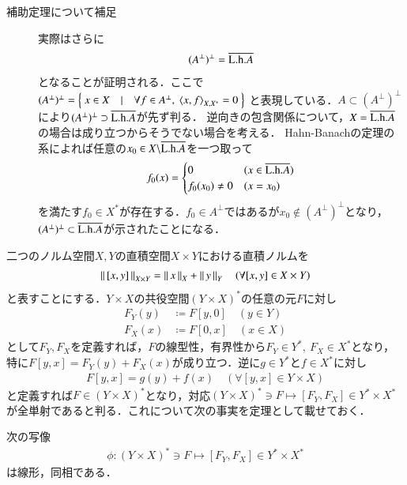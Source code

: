 	\begin{description}
		\item[補助定理について補足]
			実際はさらに
			\begin{align}
				(A^{\perp})^{\perp} = \overline{\mathrm{L.h.} A}
			\end{align}
			となることが証明される．ここで$(A^{\perp})^{\perp} = \left\{\ x \in X\quad |\quad \forall f \in A^{\perp},\ \inprod<x,f>_{X,X^*} = 0\ \right\}$
			と表現している．$A \subset (A^{\perp})^{\perp}$により$(A^{\perp})^{\perp} \supset \overline{\mathrm{L.h.} A}$が先ず判る．
			逆向きの包含関係について，$X = \overline{\mathrm{L.h.} A}$の場合は成り立つからそうでない場合を考える．
			Hahn-Banachの定理の系によれば任意の$x_0 \in X \backslash \overline{\mathrm{L.h.} A}$を一つ取って
			\begin{align}
				f_0(x) = 
				\begin{cases}
					0 & (x \in \overline{\mathrm{L.h.} A}) \\
					f_0(x_0) \neq 0 & (x = x_0)
				\end{cases}
			\end{align}
			を満たす$f_0 \in X^*$が存在する．$f_0 \in A^{\perp}$ではあるが$x_0 \notin (A^{\perp})^{\perp}$となり，
			$(A^{\perp})^{\perp} \subset \overline{\mathrm{L.h.} A}$が示されたことになる．
			\QED
	\end{description}
	
	二つのノルム空間$X,Y$の直積空間$X \times Y$における直積ノルムを
	\begin{align}
		\left\|\, [x,y]\, \right\|_{X \times Y} = \left\|\, x\, \right\|_{X} + \left\|\, y\, \right\|_{Y} \quad (\forall [x,y] \in X \times Y)
	\end{align}
	と表すことにする．$Y \times X$の共役空間$(Y \times X)^*$の任意の元$F$に対し
	\begin{align}
		F_Y(y) &\coloneqq F[y,0] \quad (y \in Y) \\
		F_X(x) &\coloneqq F[0,x] \quad (x \in X) \label{eq:thm_T_star_closed_1}
	\end{align}
	として$F_Y, F_X$を定義すれば，$F$の線型性，有界性から$F_Y \in Y^*,\ F_X \in X^*$となり，
	特に$F[y,x] = F_Y(y) + F_X(x)$が成り立つ．逆に$g \in Y^*$と$f \in X^*$に対し
	\begin{align}
		F[y,x] = g(y) + f(x) \quad (\forall [y,x] \in Y \times X)
	\end{align}
	と定義すれば$F \in (Y \times X)^*$となり，対応$(Y \times X)^* \ni F \longmapsto [F_Y,F_X] \in Y^* \times X^*$
	が全単射であると判る．これについて次の事実を定理として載せておく．
	\begin{itembox}[l]{}
		\begin{lem}
			次の写像
			\begin{align}
				\phi : (Y \times X)^* \ni F \longmapsto [F_Y,F_X] \in Y^* \times X^*
			\end{align}
			は線形，同相である．\label{lem:T_star_closed_2}
		\end{lem}
	\end{itembox}
	
